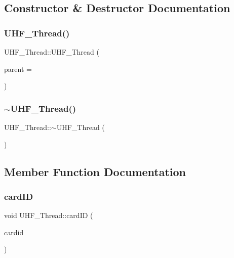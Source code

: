 \subsection{Constructor \& Destructor Documentation}
\mbox{\label{class_u_h_f___thread_a4e345d08f3f78642458925017371cac2}} 
\subsubsection{\texorpdfstring{UHF\_Thread()}{UHF\_Thread()}}
{\footnotesize\ttfamily U\+H\+F\+\_\+\+Thread\+::\+U\+H\+F\+\_\+\+Thread (\begin{DoxyParamCaption}\item[{Q\+Object $\ast$}]{parent = {} }\end{DoxyParamCaption})\hspace{0.3cm}{\ttfamily [explicit]}}

\mbox{\label{class_u_h_f___thread_a884aee3bdd34d43aa21af0ebe0012e7b}} 
\subsubsection{\texorpdfstring{$\sim$UHF\_Thread()}{~UHF\_Thread()}}
{\footnotesize\ttfamily U\+H\+F\+\_\+\+Thread\+::$\sim$\+U\+H\+F\+\_\+\+Thread (\begin{DoxyParamCaption}{ }\end{DoxyParamCaption})}



\subsection{Member Function Documentation}
\mbox{\label{class_u_h_f___thread_a4382c7acd8bb18adbaa580d3fb76ae17}} 
\subsubsection{\texorpdfstring{cardID}{cardID}}
{\footnotesize\ttfamily void U\+H\+F\+\_\+\+Thread\+::card\+ID (\begin{DoxyParamCaption}\item[{Q\+String}]{cardid }\end{DoxyParamCaption})\hspace{0.3cm}{\ttfamily [signal]}}


